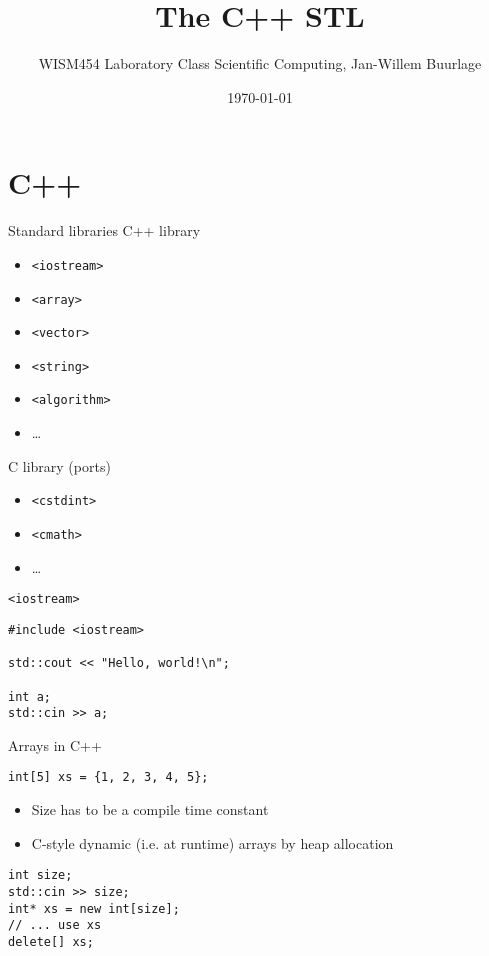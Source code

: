 \documentclass[10pt]{beamer}
\author{WISM454 Laboratory Class Scientific Computing, Jan-Willem Buurlage}
\date{\today}
\title{The C++ STL}
\begin{document}
\maketitle

\section{C++}
\label{sec:org2aad055}
\begin{frame}[fragile,label={sec:orgb7de52c}]{Standard libraries}
 C++ library

\begin{itemize}
\item \texttt{<iostream>}
\item \texttt{<array>}
\item \texttt{<vector>}
\item \texttt{<string>}
\item \texttt{<algorithm>}
\item \ldots{}
\end{itemize}

C library (ports)

\begin{itemize}
\item \texttt{<cstdint>}
\item \texttt{<cmath>}
\item \ldots{}
\end{itemize}
\end{frame}

\begin{frame}[fragile,label={sec:org57cc487}]{\texttt{<iostream>}}
 \begin{verbatim}
#include <iostream>

std::cout << "Hello, world!\n";

int a;
std::cin >> a;
\end{verbatim}
\end{frame}

\begin{frame}[fragile,label={sec:org28f256a}]{Arrays in C++}
 \begin{verbatim}
int[5] xs = {1, 2, 3, 4, 5};
\end{verbatim}
\begin{itemize}
\item Size has to be a compile time constant
\item C-style dynamic (i.e. at runtime) arrays by heap allocation
\end{itemize}

\begin{verbatim}
int size;
std::cin >> size;
int* xs = new int[size];
// ... use xs
delete[] xs;
\end{verbatim}
\end{frame}
\end{document}
